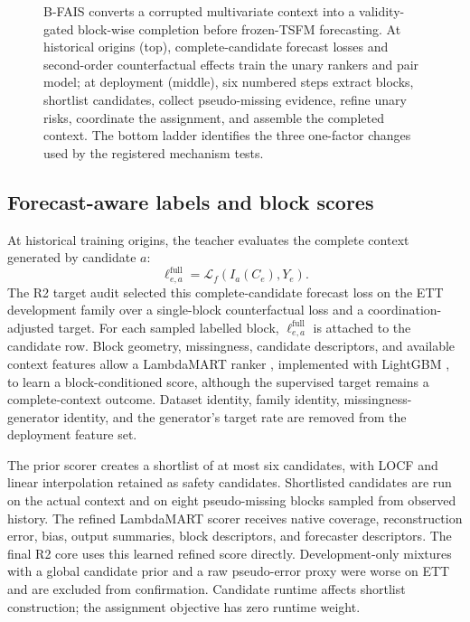 \documentclass{article}
\newcommand{\bfais}{\textsc{B-FAIS}\xspace}
\begin{document}
\begin{figure}[t]
\centering

\caption{\bfais converts a corrupted multivariate context into a validity-gated block-wise completion before frozen-TSFM forecasting. At historical origins (top), complete-candidate forecast losses and second-order counterfactual effects train the unary rankers and pair model; at deployment (middle), six numbered steps extract blocks, shortlist candidates, collect pseudo-missing evidence, refine unary risks, coordinate the assignment, and assemble the completed context. The bottom ladder identifies the three one-factor changes used by the registered mechanism tests.}
\label{fig:overview}
\end{figure}

\subsection{Forecast-aware labels and block scores}

At historical training origins, the teacher evaluates the complete context generated by candidate $a$:
\begin{equation}
 \ell^{\mathrm{full}}_{e,a}=\mathcal L_f(I_a(C_e),Y_e).
 \label{eq:full-label}
\end{equation}
The R2 target audit selected this complete-candidate forecast loss on the ETT development family over a single-block counterfactual loss and a coordination-adjusted target. For each sampled labelled block, $\ell^{\mathrm{full}}_{e,a}$ is attached to the candidate row. Block geometry, missingness, candidate descriptors, and available context features allow a LambdaMART ranker \citep{burges2010lambdamart}, implemented with LightGBM \citep{ke2017lightgbm}, to learn a block-conditioned score, although the supervised target remains a complete-context outcome. Dataset identity, family identity, missingness-generator identity, and the generator's target rate are removed from the deployment feature set.

The prior scorer creates a shortlist of at most six candidates, with LOCF and linear interpolation retained as safety candidates. Shortlisted candidates are run on the actual context and on eight pseudo-missing blocks sampled from observed history. The refined LambdaMART scorer receives native coverage, reconstruction error, bias, output summaries, block descriptors, and forecaster descriptors. The final R2 core uses this learned refined score directly. Development-only mixtures with a global candidate prior and a raw pseudo-error proxy were worse on ETT and are excluded from confirmation. Candidate runtime affects shortlist construction; the assignment objective has zero runtime weight.
\end{document}
